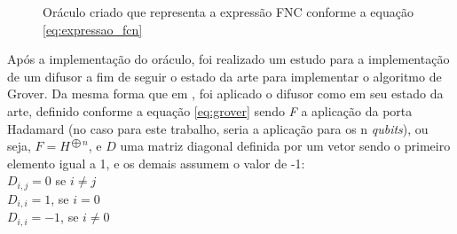 \documentclass[12pt]{article}
\begin{document}
\begin{figure}[ht]
\centering
{}
\caption{Oráculo criado que representa a expressão FNC conforme a equação \ref{eq:expressao_fcn}}
\label{fig:oraculo_final}
\end{figure}

Após a implementação do oráculo, foi realizado um estudo para a implementação de um difusor a fim de seguir o estado da arte para implementar o algoritmo de Grover.
Da mesma forma que em \cite{gamberi:22}, foi aplicado o difusor como em seu estado da arte, definido conforme a equação \ref{eq:grover} sendo \textit{F} a aplicação da porta Hadamard (no caso para este trabalho, seria a aplicação  para os n \textit{qubits}), ou seja, $F = {H}^{{\bigoplus}n}$, e $D$ uma matriz diagonal definida por um vetor sendo o primeiro elemento igual a 1, e os demais assumem o valor de -1:\\
$D_{i,j} = 0$ se $i \neq j$ \\
$D_{i,i} = 1$, se $i = 0$ \\
$D_{i,i} = -1$, se $i \neq 0$ \\
\end{document}
